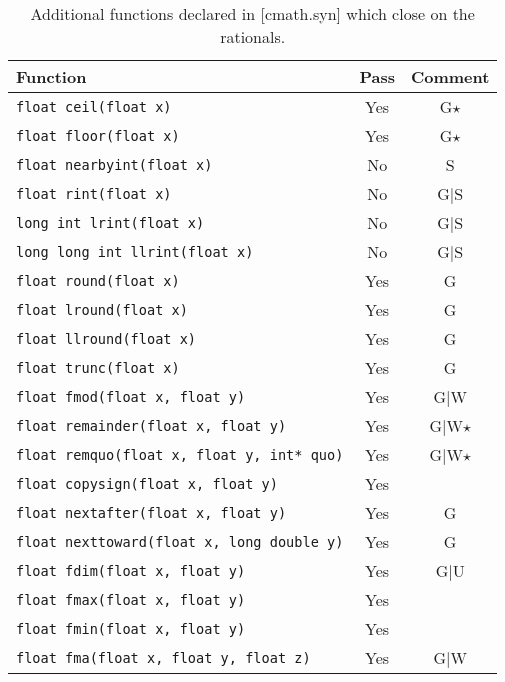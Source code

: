 \documentclass[prd,twocolumn,amsmath,amssymb,nofootinbib,eqsecnum]{revtex4-1}
\newcommand{\code}[1]{{\tt #1}}
\begin{document}
\begin{table}[b]
	\begin{tabular}{lcc}
		Function & Pass & Comment
	\\
	\hline \hline
		\code{float ceil(float x)} &  Yes & G$\star$
	\\
	\hline
		\code{float floor(float x)} & Yes & G$\star$
	\\
	\hline
		\code{float nearbyint(float x)} & No & S
	\\
	\hline
		\code{float rint(float x)} & No & G$\vert$S
	\\
	\hline
		\code{long int lrint(float x)} &  No & G$\vert$S
	\\
	\hline
		\code{long long int llrint(float x)} & No & G$\vert$S
	\\
	\hline
		\code{float round(float x)} & Yes & G
	\\
	\hline
		\code{float lround(float x)} & Yes & G
	\\
	\hline
		\code{float llround(float x)} & Yes & G
	\\
	\hline
		\code{float trunc(float x)} &  Yes & G
	\\
	\hline
		\code{float fmod(float x, float y)} & Yes & G$\vert$W
	\\
	\hline
		\code{float remainder(float x, float y)} & Yes & G$\vert$W$\star$
	\\
	\hline
		\code{float remquo(float x, float y, int* quo)} & Yes & G$\vert$W$\star$
	\\
	\hline
		\code{float copysign(float x, float y)} & Yes &
	\\
	\hline
		\code{float nextafter(float x, float y)} & Yes & G
	\\
	\hline
		\code{float nexttoward(float x, long double y)} & Yes & G
	\\
	\hline
		\code{float fdim(float x, float y)} & Yes & G$\vert$U
	\\
	\hline
		\code{float fmax(float x, float y)} & Yes &
	\\
	\hline
		\code{float fmin(float x, float y)} & Yes &
	\\
	\hline
		\code{float fma(float x, float y, float z)} & Yes & G$\vert$W
	\end{tabular}
\caption{Additional functions declared in [cmath.syn]  which close on the rationals.}
\label{tab:26.9.3}
\end{table}
\end{document}
